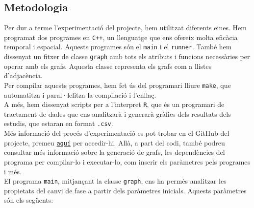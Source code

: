 \documentclass[a4paper]{article}
\begin{document}
	\subsection{Metodologia}
	\label{sec:metodologia}
	
	Per dur a terme l'experimentació del projecte, hem utilitzat diferents eines. Hem programat dos programes en \texttt{C++}, un llenguatge que ens ofereix molta eficàcia temporal i espacial. Aquests programes són el \texttt{main} i el \texttt{runner}. També hem dissenyat un fitxer de classe \texttt{graph} amb tots els atributs i funcions necessàries per operar amb els grafs. Aquesta classe representa els grafs com a llistes d'adjacència. \\
	
	Per compilar aquests programes, hem fet ús del programari lliure \texttt{make}, que automatitza i 
	paral·lelitza la compilació i l'enllaç. \\
	
	A més, hem dissenyat scripts per a l'interpret \texttt{R}, que és un programari de tractament de dades que ens analitzarà i generarà gràfics dels resultats dels estudis, que estaran en format \texttt{.csv}. \\
	
	Més informació del procés d'experimentació es pot trobar en el GitHub del projecte, premeu \href{https://github.com/Willyllem88/PercolationConnectivity}{\texttt{aquí}} per accedir-hi. Allà, a part del codi, també podreu consultar més informació sobre la generació de grafs, les dependències del programa per compilar-lo i executar-lo, com inserir els paràmetres pels programes i més. \\
	
	El programa \texttt{main}, mitjançant la classe \texttt{graph}, ens ha permès analitzar les propietats del canvi de fase a partir dels paràmetres inicials. Aquests paràmetres són els següents:
	
\end{document}
